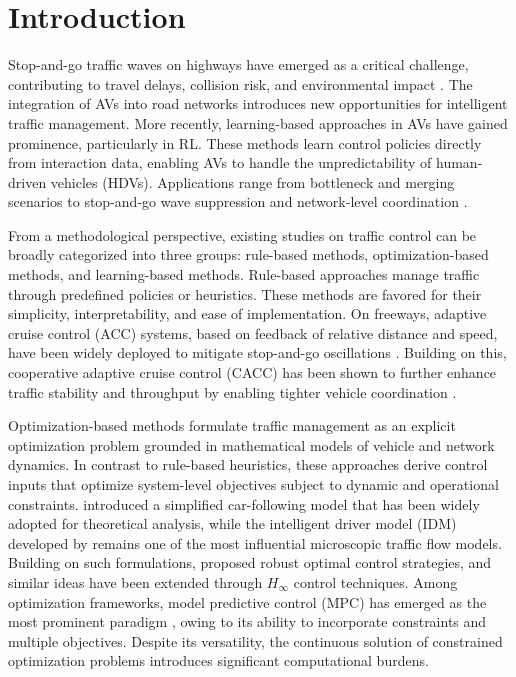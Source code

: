 \documentclass{ifacconf}
\newcommand{\1}{\mbox{1}\hspace{-0.25em}\mbox{l}}
\begin{document}
\section{Introduction}
Stop-and-go traffic waves on highways have emerged as a critical challenge, contributing to travel delays, collision risk, and environmental impact \citep{laval2010mechanism}. The integration of AVs into road networks introduces new opportunities for intelligent traffic management.  
More recently, learning-based approaches in AVs have gained prominence, particularly in RL. These methods learn control policies directly from interaction data, enabling AVs to handle the unpredictability of human-driven vehicles (HDVs). Applications range from bottleneck \citep{vinitsky2020optimizing} and merging scenarios \citep{liu2021efficient} to stop-and-go wave suppression \citep{wu2018stabilizing,9765650} and network-level coordination \citep{suriyarachchi2022multi}. 
  
  From a methodological perspective, existing studies on traffic control can be broadly categorized into three groups: rule-based methods, optimization-based methods, and learning-based methods. Rule-based approaches manage traffic through predefined policies or heuristics. These methods are favored for their simplicity, interpretability, and ease of implementation. On freeways, adaptive cruise control (ACC) systems, based on feedback of relative distance and speed, have been widely deployed to mitigate stop-and-go oscillations \citep{vahidi2004research}. Building on this, cooperative adaptive cruise control (CACC) has been shown to further enhance traffic stability and throughput by enabling tighter vehicle coordination \citep{van2006impact}. 


Optimization-based methods formulate traffic management as an explicit optimization problem grounded in mathematical models of vehicle and network dynamics. In contrast to rule-based heuristics, these approaches derive control inputs that optimize system-level objectives subject to dynamic and operational constraints. \citet{newell2002simplified} introduced a simplified car-following model that has been widely adopted for theoretical analysis, while the intelligent driver model (IDM) developed by \citet{treiber2000congested} remains one of the most influential microscopic traffic flow models. Building on such formulations, \citet{zheng2020smoothing} proposed robust optimal control strategies, and similar ideas have been extended through $H_\infty$ control techniques. Among optimization frameworks, model predictive control (MPC) has emerged as the most prominent paradigm \citep{feng2021robust}, owing to its ability to incorporate constraints and multiple objectives.
Despite its versatility, the continuous solution of constrained optimization problems introduces significant computational burdens. 
\end{document}

